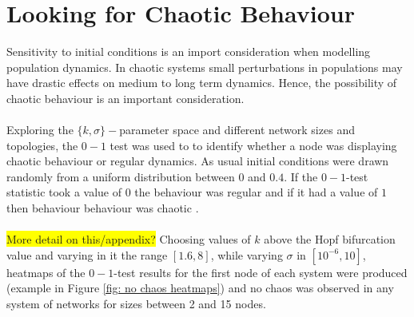 \documentclass[12pt]{article}
\begin{document}
\section{Looking for Chaotic Behaviour}\label{section:chaos}
Sensitivity to initial conditions is an import consideration when modelling population dynamics. In chaotic systems small perturbations in populations may have drastic effects on medium to long term dynamics. Hence, the possibility of chaotic behaviour is an important consideration. \\ \\
Exploring the $\{ k,\sigma \} -$parameter space and different network sizes and topologies, the $0-1$ test was used to to identify whether a node was displaying chaotic behaviour or regular dynamics. As usual initial conditions were drawn randomly from a uniform distribution between $0$ and $0.4$. If the $0-1$-test statistic took a value of $0$ the behaviour was regular and if it had a value of $1$ then behaviour behaviour was chaotic \cite{gottwald20160}. \\ \\ \colorbox{yellow}{More detail on this/appendix?} Choosing values of $k$ above the Hopf bifurcation value and varying in it the range $[1.6,8]$, while varying $\sigma$ in $[10^{-6},10]$, heatmaps of the $0-1$-test results for the first node of each system were produced (example in Figure \ref{fig: no chaos heatmaps}) and no chaos was observed in any system of networks for sizes between 2 and 15 nodes.
\end{document}
